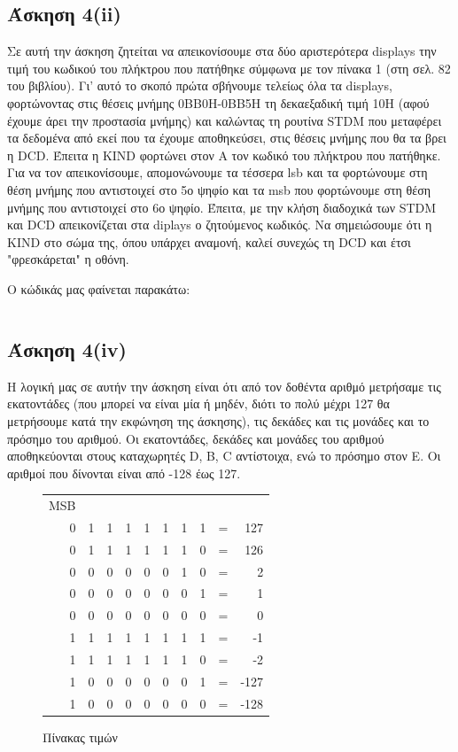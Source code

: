 \documentclass[a4paper,10pt]{article} \usepackage{anysize}
\begin{document}
\subsection*{Άσκηση 4(ii)}
Σε αυτή την άσκηση ζητείται να απεικονίσουμε στα δύο αριστερότερα displays την
τιμή του κωδικού του πλήκτρου που πατήθηκε σύμφωνα με τον πίνακα 1 (στη σελ.
82 του βιβλίου). Γι' αυτό το σκοπό πρώτα σβήνουμε τελείως όλα τα displays,
φορτώνοντας στις θέσεις μνήμης 0ΒΒ0Η-0ΒΒ5Η τη δεκαεξαδική τιμή 10Η (αφού
έχουμε άρει την προστασία μνήμης) και καλώντας τη ρουτίνα STDM που μεταφέρει
τα δεδομένα από εκεί που τα έχουμε αποθηκεύσει, στις θέσεις μνήμης που θα τα
βρει η DCD. Έπειτα η KIND φορτώνει στον Α τον κωδικό του πλήκτρου που
πατήθηκε. Για να τον απεικονίσουμε, απομονώνουμε τα τέσσερα lsb και τα
φορτώνουμε στη θέση μνήμης που αντιστοιχεί στο 5ο ψηφίο και τα msb που
φορτώνουμε στη θέση μνήμης που αντιστοιχεί στο 6ο ψηφίο. Έπειτα, με την κλήση
διαδοχικά των STDM και DCD απεικονίζεται στα diplays ο ζητούμενος κωδικός. Να
σημειώσουμε ότι η KIND στο σώμα της, όπου υπάρχει αναμονή, καλεί συνεχώς τη
DCD και έτσι "φρεσκάρεται" η οθόνη.

Ο κώδικάς μας φαίνεται παρακάτω:
\inputminted[linenos,obeytabs,frame=leftline,fontsize=\footnotesize]{oldasm}{files/askhsh_4_ii.8085}
\subsection*{Άσκηση 4(iv)}
Η λογική μας σε αυτήν την άσκηση είναι ότι από τον δοθέντα αριθμό μετρήσαμε
τις εκατοντάδες (που μπορεί να είναι μία ή μηδέν, διότι το πολύ μέχρι 127 θα
μετρήσουμε κατά την εκφώνηση της άσκησης), τις δεκάδες και τις μονάδες και το
πρόσημο του αριθμού. Οι εκατοντάδες, δεκάδες και μονάδες του αριθμού
αποθηκεύονται στους καταχωρητές  D, B, C αντίστοιχα, ενώ το πρόσημο στον E. Οι
αριθμοί που δίνονται είναι από -128 έως 127.\\

\begin{figure}[h]
\centering
\begin{tabular}{r r r r r r r r r r}
MSB &&&&&&&\\
0 & 1 & 1 & 1 & 1 & 1 & 1 & 1 & = & 127\\
0 & 1 & 1 & 1 & 1 & 1 & 1 & 0 & = & 126\\
0 & 0 & 0 & 0 & 0 & 0 & 1 & 0 & = & 2\\
0 & 0 & 0 & 0 & 0 & 0 & 0 & 1 & = & 1\\
0 & 0 & 0 & 0 & 0 & 0 & 0 & 0 & = & 0\\
1 & 1 & 1 & 1 & 1 & 1 & 1 & 1 & = & -1\\
1 & 1 & 1 & 1 & 1 & 1 & 1 & 0 & = & -2\\
1 & 0 & 0 & 0 & 0 & 0 & 0 & 1 & = & -127\\
1 & 0 & 0 & 0 & 0 & 0 & 0 & 0 & = & -128\\
\end{tabular}
\caption{Πίνακας τιμών}
\end{figure}
\end{document}
